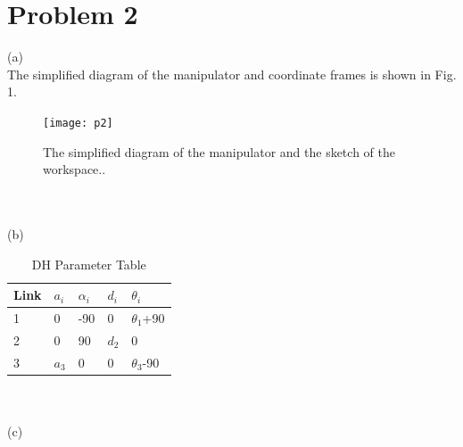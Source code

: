 \documentclass[twoside,11pt]{homework}
\begin{document}
\section*{Problem 2}
(a)\\
The simplified diagram of the manipulator and coordinate frames is shown in Fig. 1.
%
\begin{figure}[h!]
\centering
\texttt{[image: p2]}
\caption{The simplified diagram of the manipulator and the sketch of the workspace..}
\label{F1}
\end{figure}
%
\\\\
(b)
%
\begin{table}[h!] \centering
\caption{DH Parameter Table}
\begin{tabular}{|l|l|l|l|l|}
\hline
Link & $a_i$ & \textbf{$\alpha_i$} & $d_i$   & $\theta_i$ \\ \hline
1             & 0             & -90                 & 0      & $\theta_1$+90 \\ \hline
2             & 0             & 90                & $d_2$ & 0       \\ \hline
3             & $a_3$             & 0                 & 0   & $\theta_3$-90        \\ \hline
\end{tabular}
\end{table}
%
\\\\
(c)\\
\end{document}
